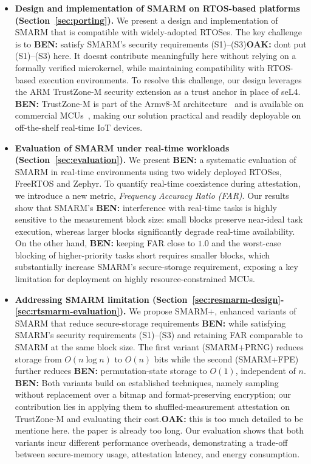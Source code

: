 \documentclass{ieeeaccess}
\DeclareRobustCommand{\oak}[1]{{\color{OAKcolor}\textbf{OAK:} #1}}
\DeclareRobustCommand{\ben}[1]{{\color{BENcolor}\textbf{BEN:} #1}}
\newcommand{\rtsmarmone}{SMARM+PRNG\xspace}
\newcommand{\rtsmarmtwo}{SMARM+FPE\xspace}
\newcommand{\acron}{SMARM+\xspace}
\begin{document}
\begin{itemize}\sloppy
    \item \textbf{Design and implementation of SMARM on RTOS-based platforms (Section~\ref{sec:porting}).}
    We present a design and implementation of SMARM that is compatible with widely-adopted RTOSes.
    The key challenge is to \ben{satisfy SMARM's security requirements (S1)--(S3)}\oak{dont put (S1)--(S3) here. It doesnt contribute meaningfully here} without relying on a formally verified microkernel, while maintaining compatibility with RTOS-based execution environments.
    To resolve this challenge, our design leverages the ARM TrustZone-M security extension as a trust anchor in place of seL4.
    \ben{TrustZone-M is part of the Armv8-M architecture~\cite{armv8m-arm} and is available on commercial MCUs~\cite{tzm-sec-iot,stm32l552_nucleo144}}, making our solution practical and readily deployable on off-the-shelf real-time IoT devices.
    
    \item \textbf{Evaluation of SMARM under real-time workloads (Section~\ref{sec:evaluation}).}
    We present \ben{a systematic evaluation} of SMARM in real-time environments using two widely deployed RTOSes, FreeRTOS and Zephyr.
    To quantify real-time coexistence during attestation, we introduce a new metric, \emph{Frequency Accuracy Ratio (FAR)}.
    Our results show that SMARM's \ben{interference with real-time tasks} is highly sensitive to the measurement block size: small blocks preserve near-ideal task execution, whereas larger blocks significantly degrade real-time availability.
    On the other hand, \ben{keeping FAR close to $1.0$ and the worst-case blocking of higher-priority tasks short} requires smaller blocks, which substantially increase SMARM's secure-storage requirement, exposing a key limitation for deployment on highly resource-constrained MCUs.
 
    \item \textbf{Addressing SMARM limitation (Section~\ref{sec:resmarm-design}-\ref{sec:rtsmarm-evaluation}).}
    We propose \acron, enhanced variants of SMARM that reduce secure-storage requirements \ben{while satisfying SMARM's security requirements (S1)--(S3) and retaining FAR comparable to SMARM at the same block size}.
    The first variant (\rtsmarmone) reduces storage from $O(n \log n)$ to $O(n)$ bits while the second (\rtsmarmtwo) further reduces \ben{permutation-state storage to $O(1)$, independent of $n$}.
    \ben{Both variants build on established techniques, namely sampling without replacement over a bitmap and format-preserving encryption; our contribution lies in applying them to shuffled-measurement attestation on TrustZone-M and evaluating their cost.}\oak{this is too much detailed to be mentione here. the paper is already too long.}
    Our evaluation shows that both variants incur different performance overheads, demonstrating a trade-off between secure-memory usage, attestation latency, and energy consumption. 


\end{itemize}
\end{document}
